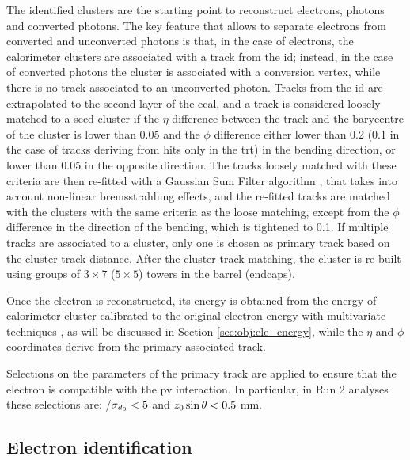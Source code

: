 The identified clusters are the starting point to reconstruct electrons, photons and converted photons. The key feature that allows to separate electrons from converted and unconverted photons is that, in the case of electrons, the calorimeter clusters are associated with a track from the \gls{id}; instead, in the case of converted photons the cluster is associated with a conversion vertex, while there is no track associated to an unconverted photon. Tracks from the \gls{id} are extrapolated to the second layer of the \gls{ecal}, and a track is considered loosely matched to a seed cluster if the $\eta$ difference between the track and the barycentre of the cluster is lower than 0.05 and the $\phi$ difference either lower than 0.2 (0.1 in the case of tracks deriving from hits only in the \gls{trt}) in the bending direction, or lower than 0.05 in the opposite direction. 
The tracks loosely matched with these criteria are then re-fitted with a Gaussian Sum Filter algorithm \cite{ATLAS-CONF-2012-047}, that takes into account non-linear bremsstrahlung effects, and the re-fitted tracks are matched with 
the clusters with the same criteria as the loose matching, except from the $\phi$ difference in the direction of the bending, which is tightened to 0.1. If multiple tracks are associated to a cluster, only one is chosen as primary track based on the cluster-track distance.
After the cluster-track matching, the cluster is re-built using groups of $3\times7$ ($5\times5$) towers in the barrel (endcaps). 

Once the electron is reconstructed, its energy is obtained from the energy of calorimeter cluster calibrated to the 
original electron energy with multivariate techniques \cite{Aad:2014nim}, as will be discussed in Section \ref{sec:obj:ele_energy}, while the $\eta$ and $\phi$ coordinates 
derive from the primary associated track.

Selections on the parameters of the primary track are applied to ensure that the electron is compatible with the \gls{pv} interaction. 
In particular, in Run 2 analyses these selections are: \dzero/$\sigma_{d_0} < 5$ and  ${z_0} \sin\theta < 0.5$ mm.


\subsection{Electron identification}
\label{sec:elec_id}

